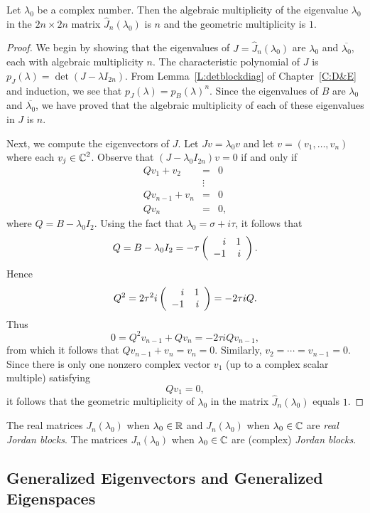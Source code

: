 \documentclass{ximera}
\begin{document}
\begin{lemma}
Let $\lambda_0$ be a complex number.  Then the algebraic multiplicity
of the eigenvalue $\lambda_0$ in the $2n\times 2n$ matrix
$\widehat{J}_n(\lambda_0)$ is $n$ and the geometric multiplicity is $1$.
\end{lemma}

\begin{proof} We begin by showing that the eigenvalues of
$J=\widehat{J}_n(\lambda_0)$ are $\lambda_0$ and $\overline{\lambda_0}$, each 
with algebraic multiplicity $n$.  The characteristic polynomial of $J$ is 
$p_J(\lambda)=\det(J-\lambda I_{2n})$.  From Lemma~\ref{L:detblockdiag} of 
Chapter~\ref{C:D&E} and induction, we see that $p_J(\lambda)=p_B(\lambda)^n$. 
Since the eigenvalues of $B$ are $\lambda_0$ and $\overline{\lambda_0}$, we
have proved that the algebraic multiplicity of each of these eigenvalues in 
$J$ is $n$.
   
Next, we compute the eigenvectors of $J$.  Let $Jv=\lambda_0v$ 
and let $v=(v_1,\ldots,v_n)$ where each $v_j\in\mbox{$\Bbb{C}$}^2$.  Observe that 
$(J-\lambda_0I_{2n})v=0$ if and only if
\begin{eqnarray*}
Qv_1 + v_2 & = & 0 \\
& \vdots & \\
Qv_{n-1} + v_n & = & 0 \\
Qv_n & = & 0,
\end{eqnarray*}
where $Q=B-\lambda_0I_2$.
Using the fact that $\lambda_0=\sigma+i\tau$, it follows that 
\[
Q=B-\lambda_0I_2 = -\tau\left(\begin{array}{rr} i & 1\\ -1 &i\end{array}\right).
\]
Hence
\[
Q^2 = 2\tau^2i\left(\begin{array}{rr} i & 1\\ -1 &i\end{array}\right)=-2\tau iQ.
\]
Thus
\[
0 = Q^2v_{n-1} + Qv_n
= -2\tau iQv_{n-1},
\]
from which it follows that $Qv_{n-1}+v_n = v_n = 0$.  Similarly, 
$v_2=\cdots=v_{n-1}=0$.  Since there is only one nonzero complex vector 
$v_1$ (up to a complex scalar multiple) satisfying
\[
Qv_1 = 0,
\]
it follows that the geometric multiplicity of $\lambda_0$ in the matrix
$\widehat{J}_n(\lambda_0)$ equals $1$.  \end{proof}

\begin{Def}  \label{D:jordanblock}
The real matrices $J_n(\lambda_0)$ when $\lambda_0\in\mbox{$\Bbb{R}$}$ and 
$\widehat{J}_n(\lambda_0)$ when $\lambda_0\in\mbox{$\Bbb{C}$}$ are {\em real Jordan
blocks\/}.  The matrices $J_n(\lambda_0)$ when $\lambda_0\in\mbox{$\Bbb{C}$}$ are (complex)
{\em Jordan blocks\/}.
\end{Def} 

\subsection*{Generalized Eigenvectors and Generalized Eigenspaces}
\end{document}
